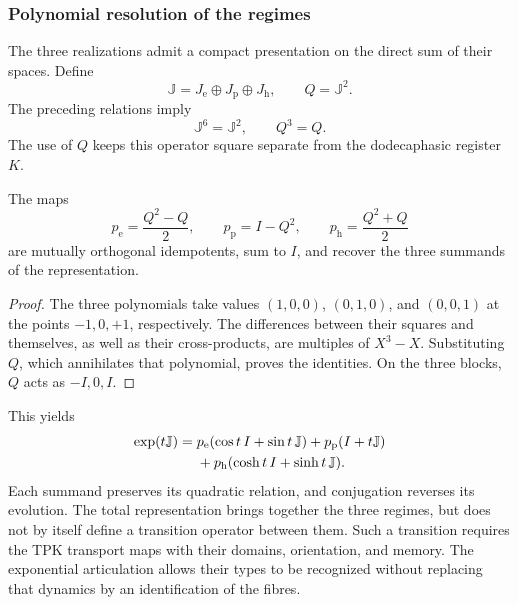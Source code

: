 \subsubsection{Polynomial resolution of the regimes}

The three realizations admit a compact presentation on the direct
sum of their spaces. Define
\[
 \mathbb J=J_{\mathrm e}\oplus J_{\mathrm p}\oplus J_{\mathrm h},
 \qquad Q=\mathbb J^2.
\]
The preceding relations imply
\[
 \mathbb J^6=\mathbb J^2,\qquad Q^3=Q.
\]
The use of \(Q\) keeps this operator square separate from the
dodecaphasic register \(K\).

\begin{proposition}
\label{euler-trit-proyectores}
The maps
\[
 p_{\mathrm e}=\frac{Q^2-Q}{2},\qquad
 p_{\mathrm p}=I-Q^2,\qquad
 p_{\mathrm h}=\frac{Q^2+Q}{2}
\]
are mutually orthogonal idempotents, sum to \(I\), and recover the three
summands of the representation.
\end{proposition}
\begin{proof}
The three polynomials take values \((1,0,0)\), \((0,1,0)\), and
\((0,0,1)\) at the points \(-1,0,+1\), respectively. The differences
between their squares and themselves, as well as their cross-products, are
multiples of \(X^3-X\). Substituting \(Q\), which annihilates that polynomial, proves
the identities. On the three blocks, \(Q\) acts as \(-I,0,I\).
\end{proof}

This yields
\begin{align}
 \exp(t\mathbb J)
 ={}&p_{\mathrm e}(\cos t\,I+\sin t\,\mathbb J)
   +p_{\mathrm p}(I+t\mathbb J)\notag\\
   &+p_{\mathrm h}(\cosh t\,I+\sinh t\,\mathbb J).
 \label{euler-trit-exponencial-total}
\end{align}
Each summand preserves its quadratic relation, and conjugation reverses
its evolution. The total representation brings together the three regimes, but
does not by itself define a transition operator between them. Such a transition
requires the TPK transport maps with their domains, orientation, and
memory. The exponential articulation allows their types to be recognized without
replacing that dynamics by an identification of the fibres.

